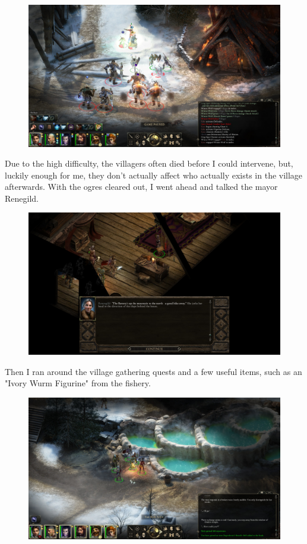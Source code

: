 \documentclass{article}
\begin{document}
\begin{figure}
\includegraphics[scale=0.33]{files/blog/2019_08_17_poe_potd_wmpt1/2019_08_17_stalwart_1.jpg}
\end{figure}

Due to the high difficulty, the villagers often died before I could intervene, but, luckily enough for me, they don't actually affect who actually exists in the village afterwards.  With the ogres cleared out, I went ahead and talked the mayor Renegild.

\begin{figure}
\includegraphics[scale=0.33]{files/blog/2019_08_17_poe_potd_wmpt1/2019_08_17_stalwart_2.jpg}
\end{figure}

Then I ran around the village gathering quests and a few useful items, such as an "Ivory Wurm Figurine" from the fishery.

\begin{figure}
\includegraphics[scale=0.33]{files/blog/2019_08_17_poe_potd_wmpt1/2019_08_17_stalwart_3.jpg}
\end{figure}
\end{document}

